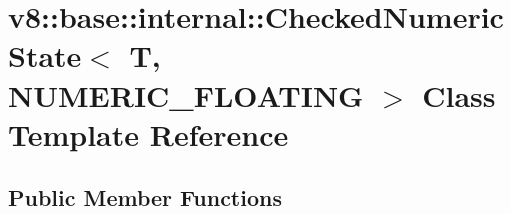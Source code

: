\hypertarget{classv8_1_1base_1_1internal_1_1CheckedNumericState_3_01T_00_01NUMERIC__FLOATING_01_4}{}\section{v8\+:\+:base\+:\+:internal\+:\+:Checked\+Numeric\+State$<$ T, N\+U\+M\+E\+R\+I\+C\+\_\+\+F\+L\+O\+A\+T\+I\+NG $>$ Class Template Reference}
\label{classv8_1_1base_1_1internal_1_1CheckedNumericState_3_01T_00_01NUMERIC__FLOATING_01_4}
\subsection*{Public Member Functions}
